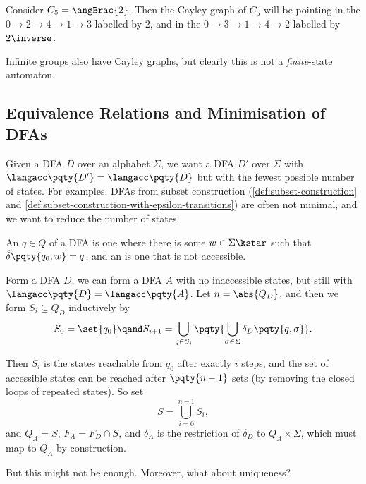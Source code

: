 \begin{example*}
    Consider \(C_5 = \angBrac{2}\). Then the Cayley graph of \(C_5\) will be pointing in the \(0 \to 2 \to 4 \to 1 \to 3\) labelled by \(2\), and in the \(0 \to 3 \to 1 \to 4 \to 2\) labelled by \(2\inverse\).
\end{example*}

Infinite groups also have Cayley graphs, but clearly this is not a \emph{finite}-state automaton.

\normalsize

\subsection{Equivalence Relations and Minimisation of DFAs}

Given a DFA \(D\) over an alphabet \(\Sigma\), we want a DFA \(D'\) over \(\Sigma\) with \(\langacc\pqty{D'} = \langacc\pqty{D}\) but with the fewest possible number of states. For examples, DFAs from subset construction (\autoref{def:subset-construction} and \autoref{def:subset-construction-with-epsilon-transitions}) are often not minimal, and we want to reduce the number of states.

\begin{definition}
    \label{def:accessible-and-inaccessible-states}%
    An  \(q \in Q\) of a DFA is one where there is some \(w \in \Sigma\kstar\) such that \(\hat{\delta}\pqty{q_0, w} = q\), and an  is one that is not accessible.
\end{definition}

Form a DFA \(D\), we can form a DFA \(A\) with no inaccessible states, but still with \(\langacc\pqty{D} = \langacc\pqty{A}\). Let \(n = \abs{Q_D}\), and then we form \(S_i \subseteq Q_D\) inductively by
\[
    S_0 = \set{q_0} \qand S_{i + 1} = \bigcup_{q \in S_i} \pqty{\bigcup_{\sigma \in \Sigma} \delta_D \pqty{q, \sigma}}.
\]

Then \(S_i\) is the states reachable from \(q_0\) after exactly \(i\) steps, and the set of accessible states can be reached after \(\pqty{n - 1}\) sets (by removing the closed loops of repeated states). So set
\[
    S = \bigcup_{i = 0}^{n - 1} S_i,
\]
and \(Q_A = S\), \(F_A = F_D \cap S\), and \(\delta_A\) is the restriction of \(\delta_D\) to \(Q_A \times \Sigma\), which must map to \(Q_A\) by construction.

But this might not be enough. Moreover, what about uniqueness?

